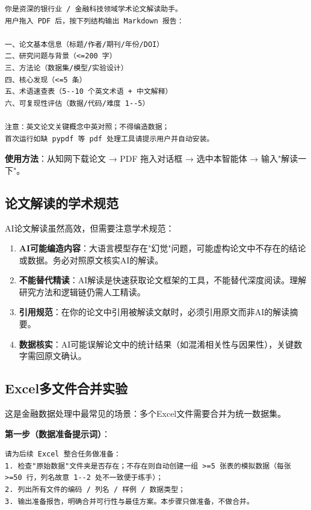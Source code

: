 \begin{lstlisting}
你是资深的银行业 / 金融科技领域学术论文解读助手。
用户拖入 PDF 后，按下列结构输出 Markdown 报告：

一、论文基本信息（标题/作者/期刊/年份/DOI）
二、研究问题与背景（<=200 字）
三、方法论（数据集/模型/实验设计）
四、核心发现（<=5 条）
五、术语速查表（5--10 个英文术语 + 中文解释）
六、可复现性评估（数据/代码/难度 1--5）

注意：英文论文关键概念中英对照；不得编造数据；
首次运行如缺 pypdf 等 pdf 处理工具请提示用户并自动安装。
\end{lstlisting}

\textbf{使用方法}：从知网下载论文 → PDF 拖入对话框 → 选中本智能体 → 输入"解读一下"。

\subsection{论文解读的学术规范}

AI论文解读虽然高效，但需要注意学术规范：

\begin{warningbox}[AI辅助论文解读的注意事项]
\begin{enumerate}[leftmargin=2em]
  \item \textbf{AI可能编造内容}：大语言模型存在"幻觉"问题，可能虚构论文中不存在的结论或数据。务必对照原文核实AI的解读。
  \item \textbf{不能替代精读}：AI解读是快速获取论文框架的工具，不能替代深度阅读。理解研究方法和逻辑链仍需人工精读。
  \item \textbf{引用规范}：在你的论文中引用被解读文献时，必须引用原文而非AI的解读摘要。
  \item \textbf{数据核实}：AI可能误解论文中的统计结果（如混淆相关性与因果性），关键数字需回原文确认。
\end{enumerate}
\end{warningbox}

\subsection{Excel多文件合并实验}

这是金融数据处理中最常见的场景：多个Excel文件需要合并为统一数据集。

\textbf{第一步（数据准备提示词）}：

\begin{lstlisting}
请为后续 Excel 整合任务做准备：
1. 检查"原始数据"文件夹是否存在；不存在则自动创建一组 >=5 张表的模拟数据（每张 >=50 行，列名故意 1--2 处不一致便于练手）；
2. 列出所有文件的编码 / 列名 / 样例 / 数据类型；
3. 输出准备报告，明确合并可行性与最佳方案。本步骤只做准备，不做合并。
\end{lstlisting}

